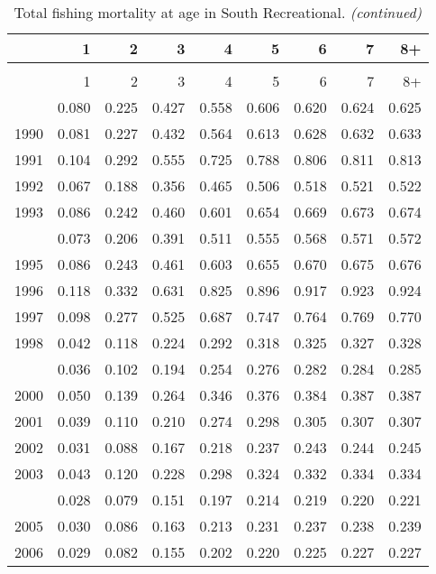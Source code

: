 \documentclass[
]{article}
\begin{document}
\begin{longtable}[t]{lrrrrrrrr}
\caption{\label{tab:South_Recreational-fleet-FAA-table}Total fishing mortality at age in South Recreational.}\\
\toprule
  & 1 & 2 & 3 & 4 & 5 & 6 & 7 & 8+\\
\midrule
\endfirsthead
\caption[]{Total fishing mortality at age in South Recreational. \textit{(continued)}}\\
\toprule
  & 1 & 2 & 3 & 4 & 5 & 6 & 7 & 8+\\
\midrule
\endhead

\endfoot
\bottomrule
\endlastfoot
1989 & 0.080 & 0.225 & 0.427 & 0.558 & 0.606 & 0.620 & 0.624 & 0.625\\
1990 & 0.081 & 0.227 & 0.432 & 0.564 & 0.613 & 0.628 & 0.632 & 0.633\\
1991 & 0.104 & 0.292 & 0.555 & 0.725 & 0.788 & 0.806 & 0.811 & 0.813\\
1992 & 0.067 & 0.188 & 0.356 & 0.465 & 0.506 & 0.518 & 0.521 & 0.522\\
1993 & 0.086 & 0.242 & 0.460 & 0.601 & 0.654 & 0.669 & 0.673 & 0.674\\
\addlinespace
1994 & 0.073 & 0.206 & 0.391 & 0.511 & 0.555 & 0.568 & 0.571 & 0.572\\
1995 & 0.086 & 0.243 & 0.461 & 0.603 & 0.655 & 0.670 & 0.675 & 0.676\\
1996 & 0.118 & 0.332 & 0.631 & 0.825 & 0.896 & 0.917 & 0.923 & 0.924\\
1997 & 0.098 & 0.277 & 0.525 & 0.687 & 0.747 & 0.764 & 0.769 & 0.770\\
1998 & 0.042 & 0.118 & 0.224 & 0.292 & 0.318 & 0.325 & 0.327 & 0.328\\
\addlinespace
1999 & 0.036 & 0.102 & 0.194 & 0.254 & 0.276 & 0.282 & 0.284 & 0.285\\
2000 & 0.050 & 0.139 & 0.264 & 0.346 & 0.376 & 0.384 & 0.387 & 0.387\\
2001 & 0.039 & 0.110 & 0.210 & 0.274 & 0.298 & 0.305 & 0.307 & 0.307\\
2002 & 0.031 & 0.088 & 0.167 & 0.218 & 0.237 & 0.243 & 0.244 & 0.245\\
2003 & 0.043 & 0.120 & 0.228 & 0.298 & 0.324 & 0.332 & 0.334 & 0.334\\
\addlinespace
2004 & 0.028 & 0.079 & 0.151 & 0.197 & 0.214 & 0.219 & 0.220 & 0.221\\
2005 & 0.030 & 0.086 & 0.163 & 0.213 & 0.231 & 0.237 & 0.238 & 0.239\\
2006 & 0.029 & 0.082 & 0.155 & 0.202 & 0.220 & 0.225 & 0.227 & 0.227\\

\end{longtable}
\end{document}
